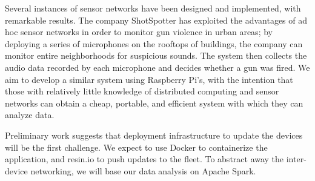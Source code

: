 \documentclass[12pt]{report}
\begin{document}
Several instances of sensor networks have been designed and implemented, with remarkable results. The company ShotSpotter has exploited the advantages of ad hoc sensor networks in order to monitor gun violence in urban areas; by deploying a series of microphones on the rooftops of buildings, the company can monitor entire neighborhoods for suspicious sounds. The system then collects the audio data recorded by each microphone and decides whether a gun was fired. We aim to develop a similar system using Raspberry Pi’s, with the intention that those with relatively little knowledge of distributed computing and sensor networks can obtain a cheap, portable, and efficient system with which they can analyze data. 

Preliminary work suggests that deployment infrastructure to update the devices will be the first challenge. We expect to use Docker to containerize the application, and resin.io to push updates to the fleet. To abstract away the inter-device networking, we will base our data analysis on Apache Spark.
\end{document}
